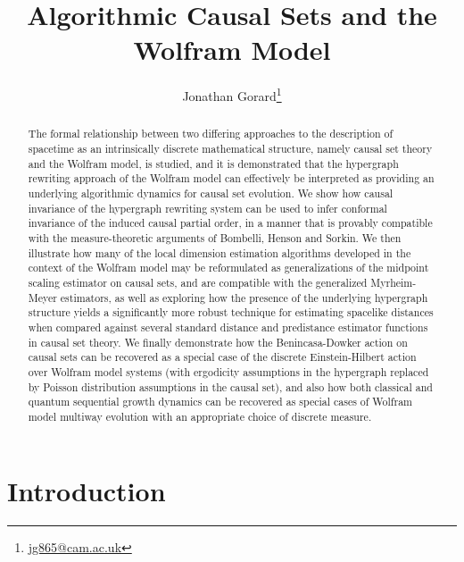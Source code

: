 \documentclass{article}
\title{Algorithmic Causal Sets and the Wolfram Model}
\author{Jonathan Gorard\footnote{\url{jg865@cam.ac.uk}}}
\begin{document}
\maketitle

\begin{abstract}
The formal relationship between two differing approaches to the description of spacetime as an intrinsically discrete mathematical structure, namely causal set theory and the Wolfram model, is studied, and it is demonstrated that the hypergraph rewriting approach of the Wolfram model can effectively be interpreted as providing an underlying algorithmic dynamics for causal set evolution. We show how causal invariance of the hypergraph rewriting system can be used to infer conformal invariance of the induced causal partial order, in a manner that is provably compatible with the measure-theoretic arguments of Bombelli, Henson and Sorkin. We then illustrate how many of the local dimension estimation algorithms developed in the context of the Wolfram model may be reformulated as generalizations of the midpoint scaling estimator on causal sets, and are compatible with the generalized Myrheim-Meyer estimators, as well as exploring how the presence of the underlying hypergraph structure yields a significantly more robust technique for estimating spacelike distances when compared against several standard distance and predistance estimator functions in causal set theory. We finally demonstrate how the Benincasa-Dowker action on causal sets can be recovered as a special case of the discrete Einstein-Hilbert action over Wolfram model systems (with ergodicity assumptions in the hypergraph replaced by Poisson distribution assumptions in the causal set), and also how both classical and quantum sequential growth dynamics can be recovered as special cases of Wolfram model multiway evolution with an appropriate choice of discrete measure.
\end{abstract}

\newpage

\tableofcontents

\section{Introduction}
\end{document}
